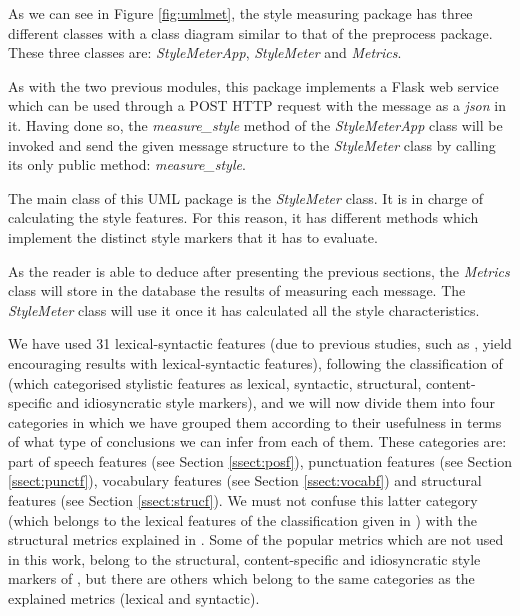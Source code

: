 As we can see in Figure \ref{fig:umlmet}, the style measuring package has three different classes with a class diagram similar to that of the preprocess package. These three classes are: \textit{StyleMeterApp}, \textit{StyleMeter} and \textit{Metrics}.

As with the two previous modules, this package implements a Flask web service which can be used through a POST HTTP request with the message as a \textit{json} in it. Having done so, the \textit{measure\_style} method of the \textit{StyleMeterApp} class will be invoked and send the given message structure to the \textit{StyleMeter} class by calling its only public method: \textit{measure\_style}.

The main class of this UML package is the \textit{StyleMeter} class. It is in charge of calculating the style features. For this reason, it has different methods which implement the distinct style markers that it has to evaluate.

As the reader is able to deduce after presenting the previous sections, the \textit{Metrics} class will store in the database the results of measuring each message. The \textit{StyleMeter} class will use it once it has calculated all the style characteristics.

We have used 31 lexical-syntactic features (due to previous studies, such as \cite{homem2011authorship}, yield encouraging results with lexical-syntactic features), following the classification of \cite{abbasi2008writeprints} (which categorised stylistic features as lexical, syntactic, structural, content-specific and idiosyncratic style markers), and we will now divide them into four categories in which we have grouped them according to their usefulness in terms of what type of conclusions we can infer from each of them. These categories are: part of speech features (see Section \ref{ssect:posf}), punctuation features (see Section \ref{ssect:punctf}), vocabulary features (see Section \ref{ssect:vocabf}) and structural features (see Section \ref{ssect:strucf}). We must not confuse this latter category (which belongs to the lexical features of the classification given in \cite{abbasi2008writeprints}) with the structural metrics explained in \cite{abbasi2008writeprints}. Some of the popular metrics which are not used in this work, belong to the structural, content-specific and idiosyncratic style markers of \cite{abbasi2008writeprints}, but there are others which belong to the same categories as the explained metrics (lexical and syntactic).

